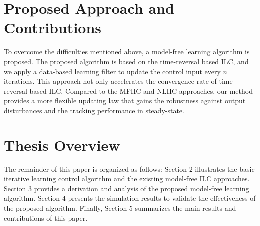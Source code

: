 \section{Proposed Approach and Contributions}
\label{sec:Proposed Approach and Contributions}

To overcome the difficulties mentioned above, a model-free learning algorithm is proposed. The proposed algorithm is based on the time-reversal based ILC, and we apply a data-based learning filter to update the control input every $n$ iterations. This approach not only accelerates the convergence rate of time-reversal based ILC. Compared to the MFIIC and NLIIC approaches, our method provides a more flexible updating law that gains the robustness against output disturbances and the tracking performance in steady-state.

\section{Thesis Overview}
\label{sec:Thesis Overview}

The remainder of this paper is organized as follows: Section 2 illustrates the basic iterative learning control algorithm and the existing model-free ILC approaches. Section 3 provides a derivation and analysis of the proposed model-free learning algorithm. Section 4 presents the simulation results to validate the effectiveness of the proposed algorithm. Finally, Section 5 summarizes the main results and contributions of this paper.